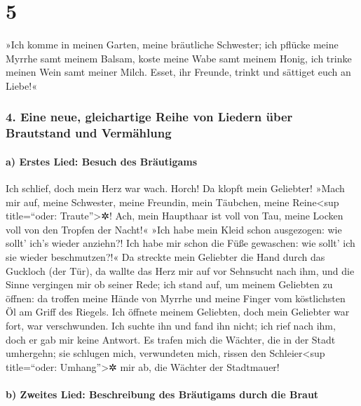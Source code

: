\hypertarget{section-4}{%
\section{5}\label{section-4}}

»Ich komme in meinen Garten, meine bräutliche Schwester;
ich pflücke meine Myrrhe samt meinem Balsam, koste meine Wabe samt
meinem Honig, ich trinke meinen Wein samt meiner Milch. Esset, ihr
Freunde, trinkt und sättiget euch an Liebe!«

\hypertarget{eine-neue-gleichartige-reihe-von-liedern-uxfcber-brautstand-und-vermuxe4hlung}{%
\subsubsection{4. Eine neue, gleichartige Reihe von Liedern über
Brautstand und
Vermählung}\label{eine-neue-gleichartige-reihe-von-liedern-uxfcber-brautstand-und-vermuxe4hlung}}

\hypertarget{a-erstes-lied-besuch-des-bruxe4utigams}{%
\paragraph{a) Erstes Lied: Besuch des
Bräutigams}\label{a-erstes-lied-besuch-des-bruxe4utigams}}

Ich schlief, doch mein Herz war wach. Horch! Da klopft
mein Geliebter! »Mach mir auf, meine Schwester, meine Freundin, mein
Täubchen, meine Reine\textless sup title=``oder: Traute''\textgreater✲!
Ach, mein Haupthaar ist voll von Tau, meine Locken voll von den Tropfen
der Nacht!« »Ich habe mein Kleid schon ausgezogen: wie
sollt' ich's wieder anziehn?! Ich habe mir schon die Füße gewaschen: wie
sollt' ich sie wieder beschmutzen?!« Da streckte mein
Geliebter die Hand durch das Guckloch (der Tür), da wallte das Herz mir
auf vor Sehnsucht nach ihm, und die Sinne vergingen mir ob seiner Rede;
ich stand auf, um meinem Geliebten zu öffnen: da troffen
meine Hände von Myrrhe und meine Finger vom köstlichsten Öl am Griff des
Riegels. Ich öffnete meinem Geliebten, doch mein Geliebter
war fort, war verschwunden. Ich suchte ihn und fand ihn nicht; ich rief
nach ihm, doch er gab mir keine Antwort. Es trafen mich
die Wächter, die in der Stadt umhergehn; sie schlugen mich, verwundeten
mich, rissen den Schleier\textless sup title=``oder:
Umhang''\textgreater✲ mir ab, die Wächter der Stadtmauer!

\hypertarget{b-zweites-lied-beschreibung-des-bruxe4utigams-durch-die-braut}{%
\paragraph{b) Zweites Lied: Beschreibung des Bräutigams durch die
Braut}\label{b-zweites-lied-beschreibung-des-bruxe4utigams-durch-die-braut}}

